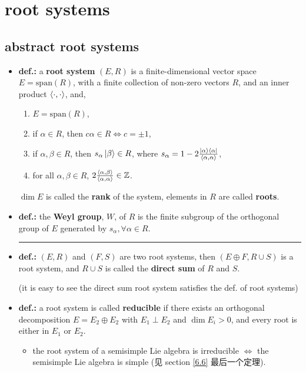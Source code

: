 \chapter{root systems}
\section{abstract root systems} \label{7.1}
\begin{itemize}
	\item \textbf{def.:} a \textbf{root system} $(E, R)$ is a finite-dimensional vector space $E = \mathrm{span}(R)$, with a finite collection of non-zero vectors $R$, and an inner product $\braket{\cdot, \cdot}$, and,
	\begin{enumerate}
		\item $E = \mathrm{span}(R)$,
		
		\item if $\alpha \in R$, then $c \alpha \in R \iff c = \pm 1$,
		
		\item if $\alpha, \beta \in R$, then $s_\alpha \ket{\beta} \in R$, where $s_\alpha = 1 - 2 \frac{\ket{\alpha} \bra{\alpha}}{\braket{\alpha, \alpha}}$,
		
		\item for all $\alpha, \beta \in R$, $2 \frac{\braket{\alpha, \beta}}{\braket{\alpha, \alpha}} \in \mathbb{Z}$.
	\end{enumerate}
	$\dim E$ is called the \textbf{rank} of the system, elements in $R$ are called \textbf{roots}.
	
	\item \textbf{def.:} the \textbf{Weyl group}, $W$, of $R$ is the finite subgroup of the orthogonal group of $E$ generated by $s_\alpha, \forall \alpha \in R$.
	
	\noindent\rule[0.5ex]{\linewidth}{0.5pt} %
	
	\item \textbf{def.:} $(E, R)$ and $(F, S)$ are two root systems, then $(E \oplus F, R \cup S)$ is a root system, and $R \cup S$ is called the \textbf{direct sum} of $R$ and $S$.
	
	(it is easy to see the direct sum root system satisfies the def. of root systems)
	
	\item \textbf{def.:} a root system is called \textbf{reducible} if there exists an orthogonal decomposition $E = E_2 \oplus E_2$ with $E_1 \perp E_2$ and $\dim E_i > 0$, and every root is either in $E_1$ or $E_2$.
	\begin{itemize}
		\item the root system of a semisimple Lie algebra is irreducible $\iff$ the semisimple Lie algebra is simple (见 section \ref{6.6} 最后一个定理).
	\end{itemize}
	

\end{itemize}

